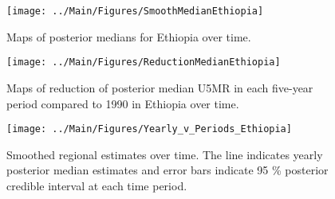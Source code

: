 \documentclass[12pt]{article}\usepackage[]{graphicx}\usepackage[]{color}
\newenvironment{knitrout}{}{} %
\begin{document}
\begin{knitrout}
\color{fgcolor}\begin{figure}[bht]

{\centering \texttt{[image: ../Main/Figures/SmoothMedianEthiopia]} 

}

\caption[Maps of posterior medians for Ethiopia  over time]{Maps of posterior medians for Ethiopia  over time.}\label{fig:unnamed-chunk-114}
\end{figure}


\end{knitrout}
\begin{knitrout}
\color{fgcolor}\begin{figure}[bht]

{\centering \texttt{[image: ../Main/Figures/ReductionMedianEthiopia]} 

}

\caption[Maps of reduction of posterior median U5MR in each five-year period compared to 1990 in Ethiopia over time]{Maps of reduction of posterior median U5MR in each five-year period compared to 1990 in Ethiopia over time.}\label{fig:unnamed-chunk-115}
\end{figure}


\end{knitrout}
\begin{knitrout}
\color{fgcolor}\begin{figure}[bht]

{\centering \texttt{[image: ../Main/Figures/Yearly\_v\_Periods\_Ethiopia]} 

}

\caption[Smoothed regional estimates over time]{Smoothed regional estimates over time. The line indicates yearly posterior median estimates and error bars indicate 95 \% posterior credible interval at each time period.}\label{fig:unnamed-chunk-116}
\end{figure}


\end{knitrout}
\end{document}
